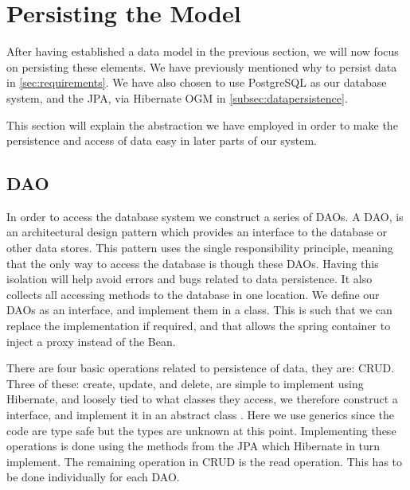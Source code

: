 \chapter{Persisting the Model}\label{subsec:persistingtodb}

After having established a data model in the previous section, we will now focus on persisting these elements.
We have previously mentioned why to persist data in \cref{sec:requirements}.
We have also chosen to use PostgreSQL as our database system, and the \ac{JPA}, via Hibernate OGM in \cref{subsec:datapersistence}.

This section will explain the abstraction we have employed in order to make the persistence and access of data easy in later parts of our system.

\section{\acl{DAO}}\label{subsubsec:dao}
In order to access the database system we construct a series of \acp{DAO}.
A \ac{DAO}, is an architectural design pattern which provides an interface to the database or other data stores\cite{oracle_dao}.
This pattern uses the single responsibility principle, meaning that the only way to access the database is though these \acp{DAO}.
Having this isolation will help avoid errors and bugs related to data persistence.
It also collects all accessing methods to the database in one location.
We define our \acp{DAO} as an interface, and implement them in a class.
This is such that we can replace the implementation if required, and that allows the spring container to inject a proxy instead of the Bean.

There are four basic operations related to persistence of data, they are: \ac{CRUD}.
Three of these: create, update, and delete, are simple to implement using Hibernate, and loosely tied to what classes they access, we therefore construct a  interface, and implement it in an abstract class .
Here we use generics since the code are type safe but the types are unknown at this point.
Implementing these operations is done using the methods from the \ac{JPA} which Hibernate in turn implement.
The remaining operation in \ac{CRUD} is the read operation.
This has to be done individually for each \ac{DAO}.

